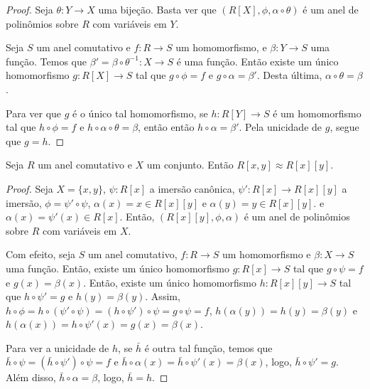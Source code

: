 \begin{proof}
Seja $\theta:Y\rightarrow X$ uma bijeção. Basta ver que $(R[X], \phi, \alpha\circ \theta)$ é um anel de polinômios sobre $R$ com variáveis em $Y$.

Seja $S$ um anel comutativo e $f:R\rightarrow S$ um homomorfismo, e $\beta:Y\rightarrow S$ uma função.
Temos que $\beta'=\beta\circ \theta^{-1}:X\rightarrow S$ é uma função.
Então existe um único homomorfismo $g: R[X]\rightarrow S$ tal que $g\circ \phi=f$ e $g\circ \alpha=\beta'$.
Desta última, $\alpha\circ \theta=\beta$.

Para ver que $g$ é o único tal homomorfismo, se $h: R[Y]\rightarrow S$ é um homomorfismo tal que $h\circ \phi=f$ e $h\circ \alpha\circ \theta=\beta$, então então $h\circ \alpha=\beta'$.
Pela unicidade de $g$, segue que $g=h$.
\end{proof}
\begin{prop}
    Seja $R$ um anel comutativo e $X$ um conjunto. Então $R[x, y]\approx R[x][y]$.
\end{prop}
\begin{proof}
    Seja $X=\{x, y\}$, $\psi:R[x]$ a imersão canônica, $\psi': R[x]\rightarrow R[x][y]$ a imersão, $\phi=\psi'\circ \psi$, $\alpha(x)=x\in R[x][y]$ e $\alpha(y)=y\in R[x][y]$. e $\alpha(x)=\psi'(x)\in R[x]$.
    Então, $(R[x][y], \phi, \alpha)$ é um anel de polinômios sobre $R$ com variáveis em $X$.

    Com efeito, seja $S$ um anel comutativo, $f:R\rightarrow S$ um homomorfismo e $\beta:X\rightarrow S$ uma função.
    Então, existe um único homomorfismo $g:R[x]\rightarrow S$ tal que $g\circ \psi=f$ e $g(x)=\beta(x)$.
    Então, existe um único homomorfismo $h:R[x][y]\rightarrow S$ tal que $h\circ \psi'=g$ e $h(y)=\beta(y)$.
    Assim, $h\circ \phi=h\circ(\psi'\circ \psi)=(h\circ \psi')\circ \psi=g\circ \psi=f$, $h(\alpha(y))=h(y)=\beta(y)$ e $h(\alpha(x))=h\circ \psi'(x)=g(x)=\beta(x)$.

    Para ver a unicidade de $h$, se $\bar h$ é outra tal função, temos que $\bar h\circ \psi=(\bar h\circ \psi')\circ \psi=f$ e $\bar h\circ \alpha(x)=\bar h\circ \psi'(x)=\beta(x)$, logo, $\bar h\circ \psi'=g$.
    Além disso, $\bar h\circ \alpha=\beta$, logo, $\bar h=h$.
\end{proof}